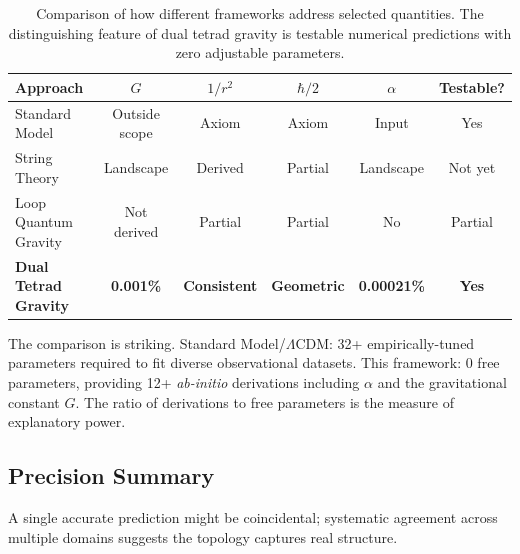 \documentclass[aps,prd,preprint,superscriptaddress,showpacs,preprintnumbers,amsmath,amssymb,nofootinbib]{revtex4-2}
\begin{document}
\begin{table}[H]
\centering
\small
\begin{tabular*}{\textwidth}{@{\extracolsep{\fill}} lccccc @{}}
\toprule
\textbf{Approach} & \textbf{$G$} & \textbf{$1/r^2$} & \textbf{$\hbar/2$} & \textbf{$\alpha$} & \textbf{Testable?} \\
\midrule
Standard Model & Outside scope & Axiom & Axiom & Input & Yes \\
String Theory & Landscape & Derived & Partial & Landscape & Not yet \\
Loop Quantum Gravity & Not derived & Partial & Partial & No & Partial \\
\textbf{Dual Tetrad Gravity} & \textbf{0.001\%} & \textbf{Consistent} & \textbf{Geometric} & \textbf{0.00021\%} & \textbf{Yes} \\
\bottomrule
\end{tabular*}
\caption{Comparison of how different frameworks address selected quantities. The distinguishing feature of dual tetrad gravity is testable numerical predictions with zero adjustable parameters.}
\label{tab:comparison}
\end{table}

The comparison is striking. Standard Model/$\Lambda$CDM: 32+ empirically-tuned parameters required to fit diverse observational datasets. This framework: 0 free parameters, providing 12+ \emph{ab-initio} derivations including $\alpha$ and the gravitational constant $G$. The ratio of derivations to free parameters is the measure of explanatory power.

\subsection{Precision Summary}
\label{subsec:precision}

A single accurate prediction might be coincidental; systematic agreement across multiple domains suggests the topology captures real structure.
\end{document}
